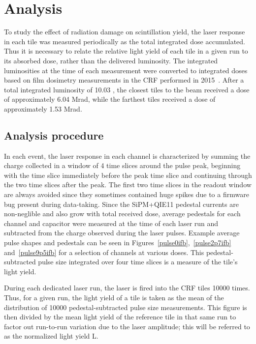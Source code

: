 \section{Analysis\label{sec:analysis}}

To study the effect of radiation damage on scintillation yield, the laser response in each tile was measured periodically as the total integrated dose accumulated. Thus it is necessary to relate the relative light yield of each tile in a given run to its absorbed dose, rather than the delivered luminosity. The integrated luminosities at the time of each measurement were converted to integrated doses based on film dosimetry measurements in the CRF performed in 2015~\cite{CMS-DN-2018-008}. After a total integrated luminosity of 10.03 \fbinv, the closest tiles to the beam received a dose of approximately 6.04 Mrad, while the farthest tiles received a dose of approximately 1.53 Mrad.

\subsection{Analysis procedure\label{sec:ana-proc}} 

In each event, the laser response in each channel is characterized by summing the charge collected in a window of 4 time slices around the pulse peak, beginning with the time slice immediately before the peak time slice and continuing through the two time slices after the peak. The first two time slices in the readout window are always avoided since they sometimes contained huge spikes due to a firmware bug present during data-taking. Since the SiPM+QIE11 pedestal currents are non-neglible and also grow with total received dose, average pedestals for each channel and capacitor were measured at the time of each laser run and subtracted from the charge observed during the laser pulses. Example average pulse shapes and pedestals can be seen in Figures~\ref{pulse0ifb},~\ref{pulse2p7ifb} and~\ref{pulse9p5ifb} for a selection of channels at various doses. This pedestal-subtracted pulse size integrated over four time slices is a measure of the tile's light yield.

During each dedicated laser run, the laser is fired into the CRF tiles 10000 times. Thus, for a given run, the light yield of a tile is taken as the mean of the distribution of 10000 pedestal-subtracted pulse size measurements. This figure is then divided by the mean light yield of the reference tile in that same run to factor out run-to-run variation due to the laser amplitude; this will be referred to as the normalized light yield L.%

